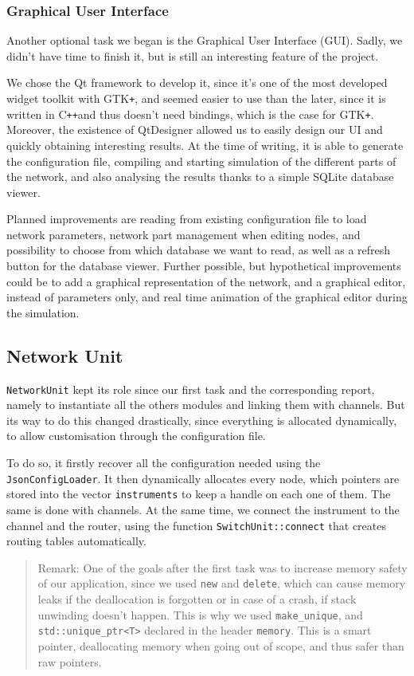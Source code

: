 \documentclass[12pt,a4paper]{article}
\newcommand{\Cpp}{C\texttt{++}}
\begin{document}
\subsubsection*{Graphical User Interface}
Another optional task we began is the Graphical User Interface (GUI). Sadly, we didn't have time to finish it, but is still an interesting feature of the project.

We chose the Qt framework to develop it, since it's one of the most developed widget toolkit with GTK\texttt{+}, and seemed easier to use than the later, since it is written in \Cpp and thus doesn't need bindings, which is the case for GTK\texttt{+}. Moreover, the existence of QtDesigner allowed us to easily design our UI and quickly obtaining interesting results. At the time of writing, it is able to generate the configuration file, compiling and starting simulation of the different parts of the network, and also analysing the results thanks to a simple SQLite database viewer.

Planned improvements are reading from existing configuration file to load network parameters, network part management when editing nodes, and possibility to choose from which database we want to read, as well as a refresh button for the database viewer.
Further possible, but hypothetical improvements could be to add a graphical representation of the network, and a graphical editor, instead of parameters only, and real time animation of the graphical editor during the simulation.

\subsection{Network Unit}
\texttt{NetworkUnit} kept its role since our first task and the corresponding report, namely to instantiate all the others modules and linking them with channels. But its way to do this changed drastically, since everything is allocated dynamically, to allow customisation through the configuration file.

To do so, it firstly recover all the configuration needed using the \texttt{JsonConfigLoader}. It then dynamically allocates every node, which pointers are stored into the vector \texttt{instruments} to keep a handle on each one of them. The same is done with channels. At the same time, we connect the instrument to the channel and the router, using the function \texttt{SwitchUnit::connect} that creates routing tables automatically. 
\begin{quote}
Remark: One of the goals after the first task was to increase memory safety of our application, since we used \texttt{new} and \texttt{delete}, which can cause memory leaks if the deallocation is forgotten or in case of a crash, if stack unwinding doesn't happen. This is why we used \texttt{make\_unique}, and \texttt{std::unique\_ptr<T>} declared in the header \texttt{memory}. This is a smart pointer, deallocating memory when going out of scope, and thus safer than raw pointers.
\end{quote}
\end{document}
